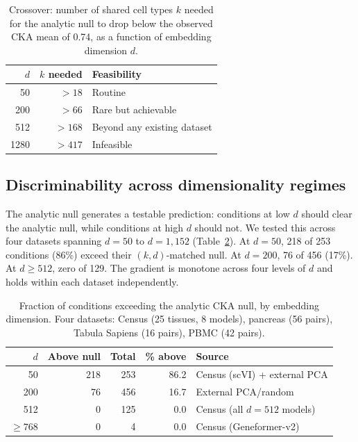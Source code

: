 \documentclass[11pt]{article}
\begin{document}
\medskip
\begin{table}[t]
\centering
\caption{Crossover: number of shared cell types $k$ needed for the
analytic null to drop below the observed CKA mean of 0.74, as a function
of embedding dimension $d$.}
\label{tab:crossover}
\small
\begin{tabular}{@{}rrl@{}}
\toprule
$d$ & $k$ needed & Feasibility \\
\midrule
50   & $> 18$  & Routine \\
200  & $> 66$  & Rare but achievable \\
512  & $> 168$ & Beyond any existing dataset \\
1280 & $> 417$ & Infeasible \\
\bottomrule
\end{tabular}
\end{table}


\subsection{Discriminability across dimensionality regimes}
\label{sec:deffect}

The analytic null generates a testable prediction: conditions at low $d$
should clear the analytic null, while conditions at high $d$ should not. We
tested this across four datasets spanning $d = 50$ to $d = 1{,}152$
(Table~\ref{tab:deffect}). At $d = 50$, 218 of 253 conditions (86\%)
exceed their $(k, d)$-matched null. At $d = 200$, 76 of 456 (17\%).
At $d \geq 512$, zero of 129. The gradient is monotone across four
levels of $d$ and holds within each dataset independently.

\medskip
\begin{table}[t]
\centering
\caption{Fraction of conditions exceeding the analytic CKA null, by
embedding dimension. Four datasets: Census (25 tissues, 8 models),
pancreas (56 pairs), Tabula Sapiens (16 pairs), PBMC (42 pairs).}
\label{tab:deffect}
\small
\begin{tabular}{@{}rrrrl@{}}
\toprule
$d$ & Above null & Total & \% above & Source \\
\midrule
50   & 218 & 253 & 86.2 & Census (scVI) + external PCA \\
200  &  76 & 456 & 16.7 & External PCA/random \\
512  &   0 & 125 &  0.0 & Census (all $d{=}512$ models) \\
$\geq 768$ & 0 & 4 & 0.0 & Census (Geneformer-v2) \\
\bottomrule
\end{tabular}
\end{table}
\end{document}
